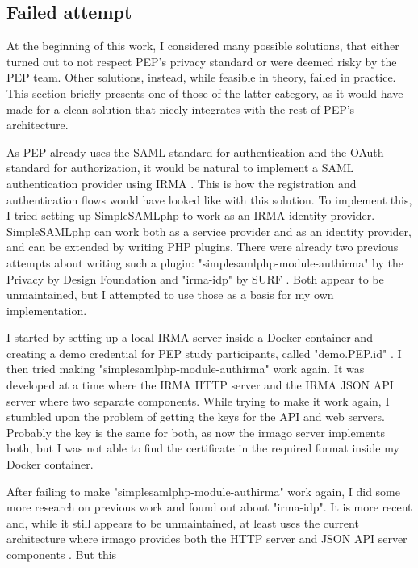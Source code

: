 \documentclass{report}
\begin{document}
\subsection{Failed attempt}
At the beginning of this work, I considered many possible solutions, that either turned out to not respect PEP's privacy standard or were deemed risky by the PEP team. Other
solutions, instead, while feasible in theory, failed in practice. This section briefly presents one of those of the latter category, as it would have made for a clean solution that
nicely integrates with the rest of PEP's architecture. \par
As PEP already uses the SAML standard \cite{sstc-saml-core-errata-2.0-wd-07} for authentication and the OAuth standard \cite{OAuth} for authorization, it would be natural to implement a 
SAML authentication provider using IRMA \cite{irma-app}.
This is how the registration and authentication flows would have looked like with this solution. 
To implement this, I tried setting up SimpleSAMLphp \cite{simplesamlphp} to work as an IRMA \cite{about-irma} identity provider. SimpleSAMLphp can work both as a service provider and
as an identity provider, and can be extended by writing PHP plugins. There were already two previous attempts about writing such a plugin: 
"simplesamlphp-module-authirma" \cite{simplesamlphp-module-authirma} by the Privacy by Design Foundation \cite{privacybydesignfoundation} and "irma-idp" \cite{irma-idp} by SURF \cite{surf}.
Both appear to be unmaintained, but I attempted to use those as a basis for my own implementation. \par
I started by setting up a local IRMA server inside a Docker container and creating a demo credential for PEP study participants, called "demo.PEP.id" . I
then tried making "simplesamlphp-module-authirma" work again. It was developed at a time where the IRMA HTTP server and the IRMA JSON API server where two separate components. While
trying to make it work again, I stumbled upon the problem of getting the keys for the API and web servers. Probably the key is the same for both, as now the irmago
server \cite{irma-docs-server} implements both, but I was not able to find the certificate in the required format inside my Docker container. \par
After failing to make "simplesamlphp-module-authirma" work again, I did some more research on previous work and found out about "irma-idp". It is more recent and, while it still
appears to be unmaintained, at least uses the current architecture where irmago provides both the HTTP server and JSON API server components \cite{irma-docs-server}. But this
\end{document}

